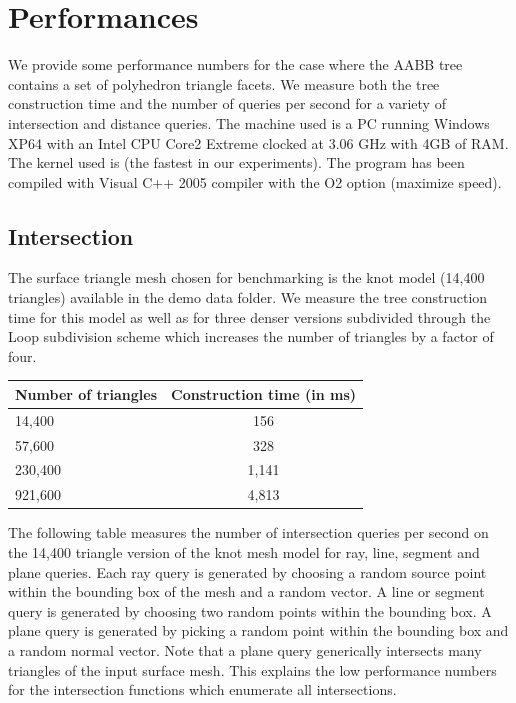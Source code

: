 \section{Performances}
\label{AABB_tree_section_performances}

We provide some performance numbers for the case where the AABB tree contains a set of polyhedron triangle facets. We measure both the tree construction time and the number of queries per second for a variety of intersection and distance queries. The machine used is a PC running Windows XP64 with an Intel CPU Core2 Extreme clocked at 3.06 GHz with 4GB of RAM. The kernel used is  (the fastest in our experiments). The program has been compiled with Visual C++ 2005 compiler with the O2 option (maximize speed).

\subsection{Intersection}

The surface triangle mesh chosen for benchmarking is the knot model (14,400 triangles) available in the demo data folder. We measure the tree construction time for this model as well as for three denser versions subdivided through the Loop subdivision scheme which increases the number of triangles by a factor of four.

\begin{tabular}{|l|c|}
  \hline
  Number of triangles & Construction time (in ms)\\
  \hline
   14,400 &   156 \\
   57,600 &   328 \\
  230,400 & 1,141 \\
  921,600 & 4,813 \\
  \hline
\end{tabular}

The following table measures the number of intersection queries per second on the 14,400 triangle version of the knot mesh model for ray, line, segment and plane queries. Each ray query is generated by choosing a random source point within the bounding box of the mesh and a random vector. A line or segment query is generated by choosing two random points within the bounding box. A plane query is generated by picking a random point within the bounding box and a random normal vector. Note that a plane query generically intersects many triangles of the input surface mesh. This explains the low performance numbers for the intersection functions which enumerate all intersections.

